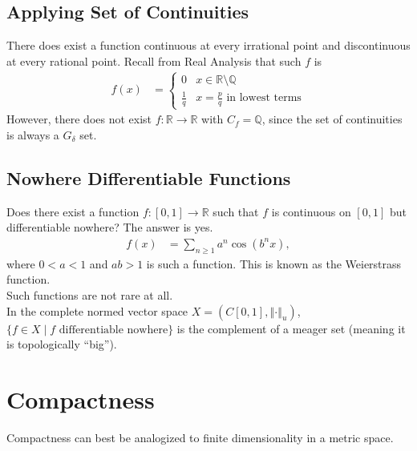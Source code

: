 \documentclass[9pt]{extarticle}
\newcommand{\Q}{\mathbb{Q}}
\newcommand{\R}{\mathbb{R}}
\newcommand{\norm}[1]{\left\Vert #1 \right\Vert}
\begin{document}
  \subsection{Applying Set of Continuities}%
  There does exist a function continuous at every irrational point and discontinuous at every rational point. Recall from Real Analysis that such $f$ is
  \begin{align*}
    f(x) &= \begin{cases}
      0 & x\in \R\setminus \Q\\
      \frac{1}{q} & x = \frac{p}{q}\text{ in lowest terms}
    \end{cases}
  \end{align*}
  However, there does not exist $f: \R\rightarrow \R$ with $C_f = \Q$, since the set of continuities is always a $G_{\delta}$ set.
  \subsection{Nowhere Differentiable Functions}%
  Does there exist a function $f: [0,1]\rightarrow \R$ such that $f$ is continuous on $[0,1]$ but differentiable nowhere? The answer is yes.
  \begin{align*}
    f(x) &= \sum_{n\geq 1} a^n\cos(b^n x),
  \end{align*}
  where $0 < a < 1$ and $ab > 1$ is such a function. This is known as the Weierstrass function.\\

  Such functions are not rare at all.\\

  In the complete normed vector space $X = (C[0,1],\norm{\cdot}_u)$, $\{f\in X\mid f\text{ differentiable nowhere}\}$ is the complement of a meager set (meaning it is topologically ``big'').
  \section{Compactness}%
  Compactness can best be analogized to finite dimensionality in a metric space.\\
\end{document}
